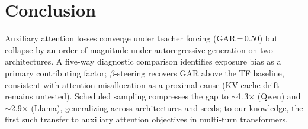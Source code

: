 \section{Conclusion}\label{sec:conclusion}

 Auxiliary attention losses converge under teacher forcing (GAR\,=\,0.50) but collapse by an order of magnitude under autoregressive generation on two architectures. A five-way diagnostic comparison identifies exposure bias as a primary contributing factor; $\beta$-steering recovers GAR above the TF baseline, consistent with attention misallocation as a proximal cause (KV cache drift remains untested). Scheduled sampling compresses the gap to ${\sim}$1.3$\times$ (Qwen) and ${\sim}$2.9$\times$ (Llama), generalizing across architectures and seeds; to our knowledge, the first such transfer to auxiliary attention objectives in multi-turn transformers.
